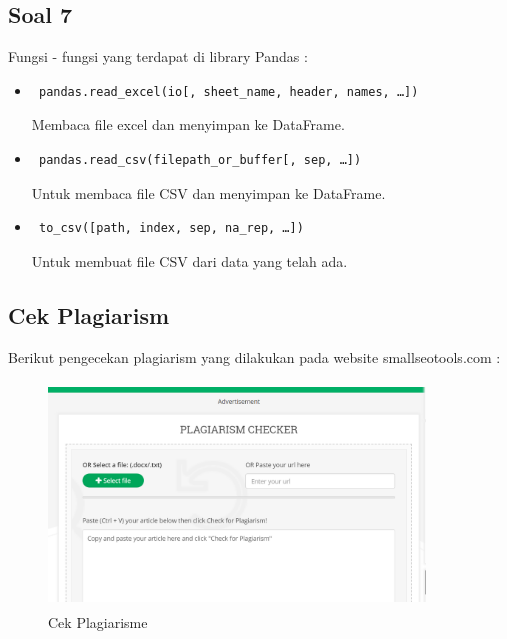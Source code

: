 \subsection{Soal 7}
Fungsi - fungsi yang terdapat di library Pandas : 
\begin{itemize}
	\item \begin{verbatim} pandas.read_excel(io[, sheet_name, header, names, …])  \end{verbatim} Membaca file excel dan menyimpan ke DataFrame.
	\item \begin{verbatim} pandas.read_csv(filepath_or_buffer[, sep, …]) \end{verbatim} Untuk membaca file CSV dan menyimpan ke DataFrame.
	\item \begin{verbatim} to_csv([path, index, sep, na_rep, …]) \end{verbatim}
	Untuk membuat file CSV dari data yang telah ada.	
\end{itemize}
\subsection{Cek Plagiarism}
Berikut pengecekan plagiarism yang dilakukan pada website smallseotools.com : 
\begin{figure}[!htbp]
	\centering
	\includegraphics[height=6cm, width=10cm]{figures/4/1174041/Teori/plagiarism.png}
	\caption{Cek Plagiarisme}
	\label{plagiarism}
\end{figure}